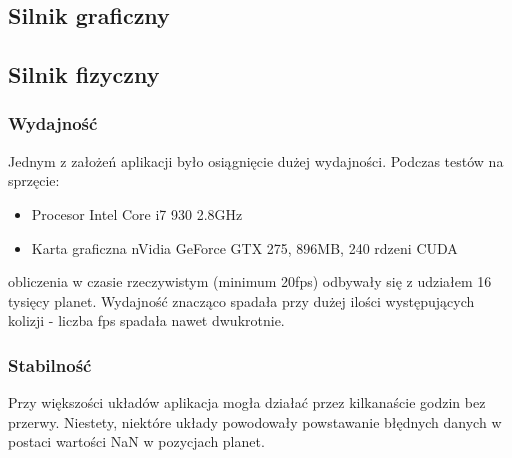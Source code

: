 \subsection{Silnik graficzny}\label{sub:silnik graficzny}

\subsection{Silnik fizyczny}\label{sub:silnik fizyczny}
\subsubsection{Wydajność}
Jednym z założeń aplikacji było osiągnięcie dużej wydajności. Podczas testów na sprzęcie:
\begin{itemize}
\item{Procesor Intel Core i7 930 2.8GHz}
\item{Karta graficzna nVidia GeForce GTX 275, 896MB, 240 rdzeni CUDA}
\end{itemize}
obliczenia w czasie rzeczywistym (minimum 20fps) odbywały się z udziałem 16 tysięcy planet. Wydajność znacząco spadała przy dużej ilości występujących kolizji - liczba fps spadała nawet dwukrotnie.

\subsubsection{Stabilność}
Przy większości układów aplikacja mogła działać przez kilkanaście godzin bez przerwy. Niestety, niektóre układy powodowały powstawanie błędnych danych w postaci wartości NaN w pozycjach planet.
